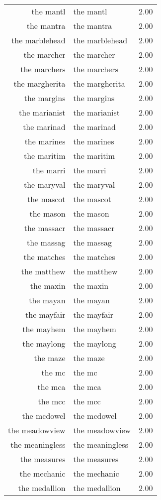 \begin{table}[ht]
\begin{tabular}{rlr}
  the mantl & the mantl & 2.00 \\ 
  the mantra & the mantra & 2.00 \\ 
  the marblehead & the marblehead & 2.00 \\ 
  the marcher & the marcher & 2.00 \\ 
  the marchers & the marchers & 2.00 \\ 
  the margherita & the margherita & 2.00 \\ 
  the margins & the margins & 2.00 \\ 
  the marianist & the marianist & 2.00 \\ 
  the marinad & the marinad & 2.00 \\ 
  the marines & the marines & 2.00 \\ 
  the maritim & the maritim & 2.00 \\ 
  the marri & the marri & 2.00 \\ 
  the maryval & the maryval & 2.00 \\ 
  the mascot & the mascot & 2.00 \\ 
  the mason & the mason & 2.00 \\ 
  the massacr & the massacr & 2.00 \\ 
  the massag & the massag & 2.00 \\ 
  the matches & the matches & 2.00 \\ 
  the matthew & the matthew & 2.00 \\ 
  the maxin & the maxin & 2.00 \\ 
  the mayan & the mayan & 2.00 \\ 
  the mayfair & the mayfair & 2.00 \\ 
  the mayhem & the mayhem & 2.00 \\ 
  the maylong & the maylong & 2.00 \\ 
  the maze & the maze & 2.00 \\ 
  the mc & the mc & 2.00 \\ 
  the mca & the mca & 2.00 \\ 
  the mcc & the mcc & 2.00 \\ 
  the mcdowel & the mcdowel & 2.00 \\ 
  the meadowview & the meadowview & 2.00 \\ 
  the meaningless & the meaningless & 2.00 \\ 
  the measures & the measures & 2.00 \\ 
  the mechanic & the mechanic & 2.00 \\ 
  the medallion & the medallion & 2.00 \\ 

\end{tabular}
\end{table}
